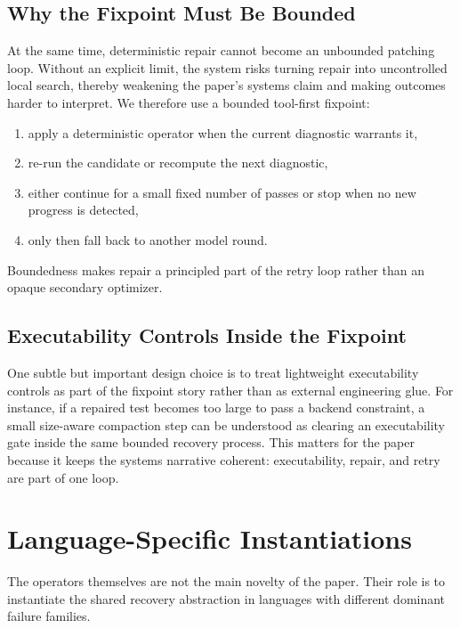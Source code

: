 \documentclass[10pt]{article}
\begin{document}
\subsection{Why the Fixpoint Must Be Bounded}

At the same time, deterministic repair cannot become an unbounded patching loop. Without an explicit limit, the system risks turning repair into uncontrolled local search, thereby weakening the paper's systems claim and making outcomes harder to interpret. We therefore use a bounded tool-first fixpoint:

\begin{enumerate}[leftmargin=1.4em]
    \item apply a deterministic operator when the current diagnostic warrants it,
    \item re-run the candidate or recompute the next diagnostic,
    \item either continue for a small fixed number of passes or stop when no new progress is detected,
    \item only then fall back to another model round.
\end{enumerate}

Boundedness makes repair a principled part of the retry loop rather than an opaque secondary optimizer.

\subsection{Executability Controls Inside the Fixpoint}

One subtle but important design choice is to treat lightweight executability controls as part of the fixpoint story rather than as external engineering glue. For instance, if a repaired test becomes too large to pass a backend constraint, a small size-aware compaction step can be understood as clearing an executability gate inside the same bounded recovery process. This matters for the paper because it keeps the systems narrative coherent: executability, repair, and retry are part of one loop.

\section{Language-Specific Instantiations}
\label{sec:languages}

The operators themselves are not the main novelty of the paper. Their role is to instantiate the shared recovery abstraction in languages with different dominant failure families.
\end{document}

